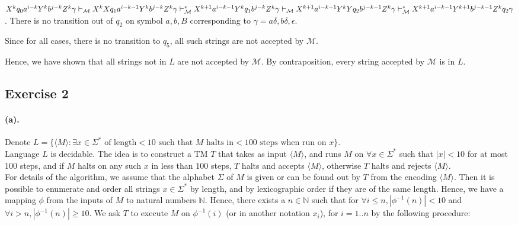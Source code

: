 \documentclass[12pt]{article}
\begin{document}
\begin{itemize}
\begin{itemize}
\begin{itemize}
      \(X^kq_0a^{i-k}Y^kb^{j-k}Z^k\gamma \vdash_\mathcal{M} X^kXq_1a^{i-k-1}Y^kb^{j-k}Z^k\gamma \vdash^*_\mathcal{M} X^{k+1}a^{i-k-1}Y^kq_1b^{j-k}Z^k\gamma \\ \vdash_\mathcal{M} X^{k+1}a^{i-k-1}Y^kYq_2b^{j-k-1}Z^k\gamma \vdash^*_\mathcal{M} X^{k+1}a^{i-k-1}Y^{k+1}b^{j-k-1}Z^kq_2\gamma\). There is no transition out of \(q_2\) on symbol \(a, b, B\) corresponding to \(\gamma = a\delta, b\delta, \epsilon\).
    \end{itemize}
  \end{itemize}
  Since for all cases, there is no transition to \(q_5\), all such strings are not accepted by \(\mathcal{M}\).
\end{itemize}
Hence, we have shown that all strings not in \(L\) are not accepted by \(\mathcal{M}\). By contraposition, every string accepted by \(\mathcal{M}\) is in \(L\).

\subsection*{Exercise 2}
\paragraph*{(a).} Denote \(L = \{\langle M \rangle : \exists x \in \Sigma^* \text{ of length} < 10 \text{ such that } M \text{ halts in} < 100 \text{ steps when run on } x\}\).\\ 
Language \(L\) is decidable. The idea is to construct a TM \(T\) that takes as input \(\langle M \rangle\), and runs \(M\) on \(\forall x \in \Sigma^*\) such that \(|x| < 10\) for at most \(100\) steps, and if \(M\) halts on any such \(x\) in less than \(100\) steps, \(T\) halts and accepts \(\langle M \rangle\), otherwise \(T\) halts and rejects \(\langle M \rangle\).\\
For details of the algorithm, we assume that the alphabet \(\Sigma\) of \(M\) is given or can be found out by \(T\) from the encoding \(\langle M \rangle\). Then it is possible to enumerate and order all strings \(x \in \Sigma^*\) by length, and by lexicographic order if they are of the same length. Hence, we have a mapping \(\phi\) from the inputs of \(M\) to natural numbers \(\mathbb{N}\). Hence, there exists a \(n \in \mathbb{N}\) such that for \(\forall i \leq n, |\phi^{-1}(n)| < 10\) and \(\forall i > n,  |\phi^{-1}(n)| \geq 10\). We ask \(T\) to execute \(M\) on \(\phi^{-1}(i)\) (or in another notation \(x_i\)), for \(i = 1 .. n \) by the following procedure:
\end{document}
